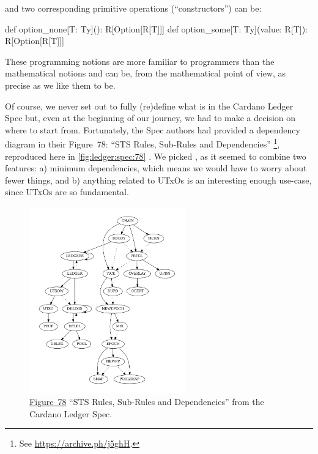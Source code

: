 \documentclass[11pt]{article}
\renewcommand{\vref}[1]{\autoref{#1} \vpageref{#1}}{}
\begin{document}
\noindent and two corresponding primitive operations (``constructors'') can 
be:

\begin{ScalaBlockSimple}
  def option_none[T: Ty](): R[Option[R[T]]]
  def option_some[T: Ty](value: R[T]): R[Option[R[T]]]
\end{ScalaBlockSimple}

\noindent These programming notions are more familiar to programmers than the 
mathematical notions and can be, from the mathematical point of view, as 
precise as we like them to be.


Of course, we never set out to fully (re)define what is in the Cardano Ledger Spec but, even at the beginning of our journey, we had to make a decision on where to start from. Fortunately, the Spec authors had provided a dependency diagram in their Figure~78: ``STS Rules, Sub-Rules and Dependencies''%
\footnote{See \href{https://archive.ph/j5ghH}{https://archive.ph/j5ghH}.}, 
reproduced here in \vref{fig:ledger:spec:78}. We picked , 
as it seemed to combine two features: a) minimum dependencies, which means we 
would have to worry about fewer things, and b) anything related to 
\textsf{UTxOs} is an interesting enough use-case, since \textsf{UTxOs} are so 
fundamental.

\begin{figure}[tb]
\centering
\includegraphics[width=0.6\textwidth]{rules}
\caption{\href{https://hydra.iohk.io/build/18363060/download/1/ledger-spec.pdf\#figure.78}{Figure~78} ``STS Rules, Sub-Rules and Dependencies'' from the Cardano Ledger Spec.}
\label{fig:ledger:spec:78}
\end{figure}
\end{document}
